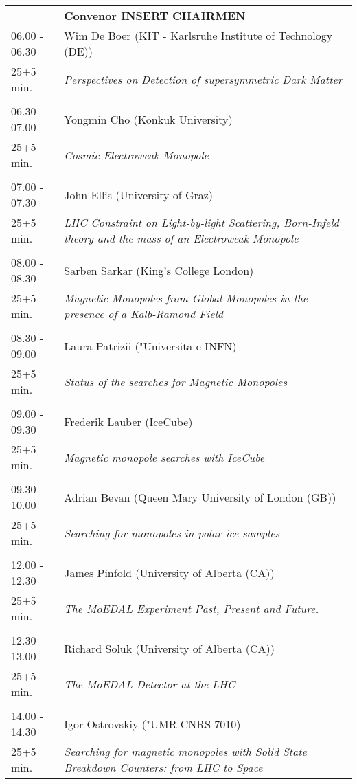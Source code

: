 \begin{longtable}{p{3cm}p{13cm}}
&\hfill {\bf Convenor INSERT CHAIRMEN }\\ 
06.00 - 06.30 & Wim De Boer (KIT - Karlsruhe Institute of  Technology (DE))\\ 
25+5 min. & {\it Perspectives on Detection of  supersymmetric Dark Matter}\\ 
 & \\ 
06.30 - 07.00 & Yongmin Cho (Konkuk University)\\ 
25+5 min. & {\it Cosmic Electroweak Monopole}\\ 
 & \\ 
07.00 - 07.30 & John Ellis (University of Graz)\\ 
25+5 min. & {\it LHC Constraint on Light-by-light Scattering, Born-Infeld theory and the mass of an Electroweak Monopole}\\ 
 & \\ 
08.00 - 08.30 & Sarben Sarkar (King's College London)\\ 
25+5 min. & {\it Magnetic Monopoles from Global Monopoles in the presence of a Kalb-Ramond Field}\\ 
 & \\ 
08.30 - 09.00 & Laura Patrizii ("Universita e INFN)\\ 
25+5 min. & {\it Status of the searches for Magnetic Monopoles}\\ 
 & \\ 
09.00 - 09.30 & Frederik Lauber (IceCube)\\ 
25+5 min. & {\it Magnetic monopole searches with IceCube}\\ 
 & \\ 
09.30 - 10.00 & Adrian Bevan (Queen Mary University of London (GB))\\ 
25+5 min. & {\it Searching for monopoles in polar ice samples}\\ 
 & \\ 
12.00 - 12.30 & James Pinfold (University of Alberta (CA))\\ 
25+5 min. & {\it The MoEDAL Experiment Past, Present and Future.}\\ 
 & \\ 
12.30 - 13.00 & Richard Soluk (University of Alberta (CA))\\ 
25+5 min. & {\it The MoEDAL Detector at the LHC}\\ 
 & \\ 
14.00 - 14.30 & Igor Ostrovskiy ("UMR-CNRS-7010)\\ 
25+5 min. & {\it Searching for magnetic monopoles with Solid State Breakdown Counters: from LHC to Space}\\ 

\end{longtable}
